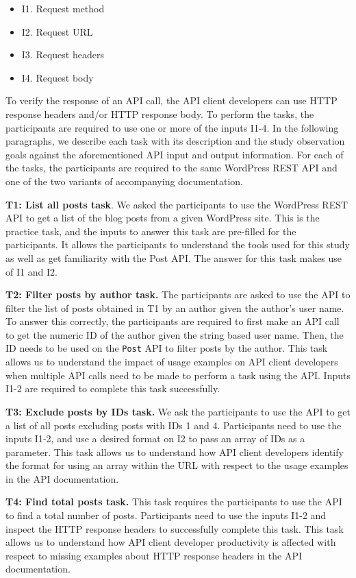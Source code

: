 \documentclass[conference]{IEEEtran}
\begin{document}
\begin{itemize}
  \item I1. Request method
  \item I2. Request URL
  \item I3. Request headers
  \item I4. Request body
\end{itemize}

To verify the response of an API call, the API client developers can use HTTP response headers and/or HTTP response body. To perform the tasks, the participants are required to use one or more of the inputs I1-4. In the following paragraphs, we describe each task with its description and the study observation goals against the aforementioned API input and output information. For each of the tasks, the participants are required to the same WordPress REST API and one of the two variants of accompanying documentation.

\textbf{T1: List all posts task}. We asked the participants to use the WordPress REST API to get a list of the blog posts from a given WordPress site. This is the practice task, and the inputs to answer this task are pre-filled for the participants. It allows the participants to understand the tools used for this study as well as get familiarity with the Post API. The answer for this task makes use of I1 and I2.

\textbf{T2: Filter posts by author task.} The participants are asked to use the API to filter the list of posts obtained in T1 by an author given the author's user name. To answer this correctly, the participants are required to first make an API call to get the numeric ID of the author given the string based user name. Then, the ID needs to be used on the \lstinline{Post} API to filter posts by the author. This task allows us to understand the impact of usage examples on API client developers when multiple API calls need to be made to perform a task using the API. Inputs I1-2 are required to complete this task successfully.

\textbf{T3: Exclude posts by IDs task.} We ask the participants to use the API to get a list of all posts excluding posts with IDs 1 and 4. Participants need to use the inputs I1-2, and use a desired format on I2 to pass an array of IDs as a parameter. This task allows us to understand how API client developers identify the format for using an array within the URL with respect to the usage examples in the API documentation.

\textbf{T4: Find total posts task.} This task requires the participants to use the API to find a total number of posts. Participants need to use the inputs I1-2 and inspect the HTTP response headers to successfully complete this task. This task allows us to understand how API client developer productivity is affected with respect to missing examples about HTTP response headers in the API documentation.
\end{document}
